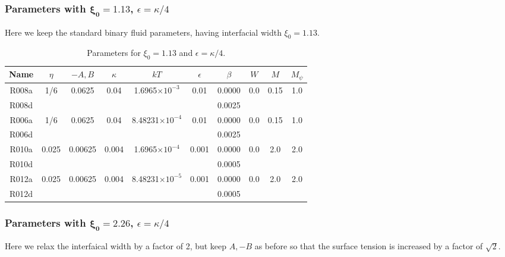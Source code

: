 \subsubsection{Parameters with $\mathbf{\xi_0 = 1.13}$, $\epsilon = \kappa/4$}

Here we keep the standard binary fluid parameters, having interfacial
width $\xi_0 = 1.13$.

\begin{table}[h]
\begin{center}
\begin{tabular}{|c|c|c|c|c|c|c|c|c|c|}
\hline
Name & $\eta$ & $-A,B$ & $\kappa$ & $kT$ & $\epsilon$ & $\beta$ & $W$
     & $M$ & $M_\psi$\\
\hline
R008a & 1/6 & 0.0625 & 0.04 & 1.6965$\times 10^{-3}$ & 0.01 & 0.0000 & 0.0 
      & 0.15 & 1.0 \\
R008d &  &  &  & & & 0.0025 &  &  &  \\
\hline
R006a & 1/6 & 0.0625 & 0.04 & 8.48231$\times 10^{-4}$ & 0.01 & 0.0000 & 0.0 
      & 0.15 & 1.0 \\
R006d & &  &  &  & & 0.0025 &  &  &  \\
\hline
R010a & 0.025 & 0.00625 & 0.004 & 1.6965$\times 10^{-4}$ & 0.001
      & 0.0000 & 0.0 & 2.0 & 2.0 \\
R010d & &  &  &  & & 0.0005 &  &  &  \\
\hline
R012a & 0.025 & 0.00625 & 0.004 & 8.48231$\times 10^{-5}$ & 0.001
      & 0.0000 & 0.0 & 2.0 & 2.0 \\
R012d & &  &  &  & & 0.0005 &  &  &  \\
\hline
\end{tabular}
\caption{Parameters for $\xi_0 = 1.13$ and $\epsilon = \kappa/4$.}
\end{center}
\end{table}



\subsubsection{Parameters with $\mathbf{\xi_0 = 2.26}$, $\epsilon = \kappa/4$}

Here we relax the interfaical width by a factor of 2, but
keep $A,-B$ as before so that the surface tension is increased
by a factor of $\sqrt{2}$.

